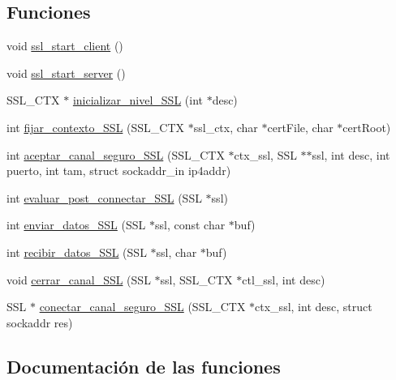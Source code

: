 \subsection*{Funciones}
\begin{DoxyCompactItemize}
\item 
void \hyperlink{G-2313-06-P3__ssl_8h_a0fc205ff57c9c0a489d8154f94cd2f4a}{ssl\+\_\+start\+\_\+client} ()
\item 
void \hyperlink{G-2313-06-P3__ssl_8h_a6dcf2890813db3e4f8f2f423716d4883}{ssl\+\_\+start\+\_\+server} ()
\item 
S\+S\+L\+\_\+\+C\+TX $\ast$ \hyperlink{G-2313-06-P3__ssl_8h_a32d6d68d1f64d25effa1ea5ec1e6bdb3}{inicializar\+\_\+nivel\+\_\+\+S\+SL} (int $\ast$desc)
\item 
int \hyperlink{G-2313-06-P3__ssl_8h_a006acb44fc7dae799271a48117f5a398}{fijar\+\_\+contexto\+\_\+\+S\+SL} (S\+S\+L\+\_\+\+C\+TX $\ast$ssl\+\_\+ctx, char $\ast$cert\+File, char $\ast$cert\+Root)
\item 
int \hyperlink{G-2313-06-P3__ssl_8h_a44410967ff9e0a1b4219c85f0e62e926}{aceptar\+\_\+canal\+\_\+seguro\+\_\+\+S\+SL} (S\+S\+L\+\_\+\+C\+TX $\ast$ctx\+\_\+ssl, S\+SL $\ast$$\ast$ssl, int desc, int puerto, int tam, struct sockaddr\+\_\+in ip4addr)
\item 
int \hyperlink{G-2313-06-P3__ssl_8h_ac5f32cf09e3c0efd5cbc25452ed192a9}{evaluar\+\_\+post\+\_\+connectar\+\_\+\+S\+SL} (S\+SL $\ast$ssl)
\item 
int \hyperlink{G-2313-06-P3__ssl_8h_adf9cb4f6b9c27081fcf12a942db1b288}{enviar\+\_\+datos\+\_\+\+S\+SL} (S\+SL $\ast$ssl, const char $\ast$buf)
\item 
int \hyperlink{G-2313-06-P3__ssl_8h_af7dca116c6dbb68e9609293102c208c5}{recibir\+\_\+datos\+\_\+\+S\+SL} (S\+SL $\ast$ssl, char $\ast$buf)
\item 
void \hyperlink{G-2313-06-P3__ssl_8h_a307ee105b4b24b555d8df68603c2deff}{cerrar\+\_\+canal\+\_\+\+S\+SL} (S\+SL $\ast$ssl, S\+S\+L\+\_\+\+C\+TX $\ast$ctl\+\_\+ssl, int desc)
\item 
S\+SL $\ast$ \hyperlink{G-2313-06-P3__ssl_8h_aa58ddc931cb106d430ab49223b9394fc}{conectar\+\_\+canal\+\_\+seguro\+\_\+\+S\+SL} (S\+S\+L\+\_\+\+C\+TX $\ast$ctx\+\_\+ssl, int desc, struct sockaddr res)
\end{DoxyCompactItemize}


\subsection{Documentación de las funciones}
